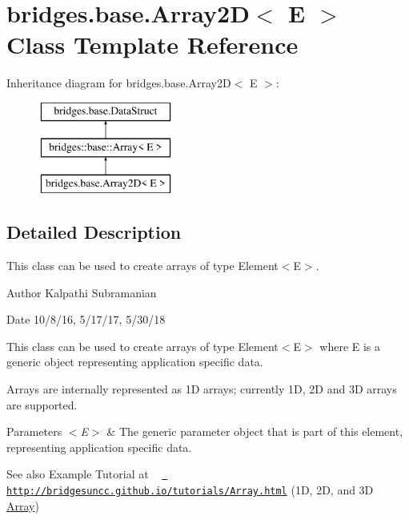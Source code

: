 \hypertarget{classbridges_1_1base_1_1_array2_d}{}\section{bridges.\+base.\+Array2D$<$ E $>$ Class Template Reference}
\label{classbridges_1_1base_1_1_array2_d}
Inheritance diagram for bridges.\+base.\+Array2D$<$ E $>$\+:\begin{figure}[H]
\begin{center}
\leavevmode
\includegraphics[height=3.000000cm]{classbridges_1_1base_1_1_array2_d}
\end{center}
\end{figure}


\subsection{Detailed Description}
This class can be used to create arrays of type Element$<$\+E$>$. 

\begin{DoxyAuthor}{Author}
Kalpathi Subramanian
\end{DoxyAuthor}
\begin{DoxyDate}{Date}
10/8/16, 5/17/17, 5/30/18
\end{DoxyDate}
This class can be used to create arrays of type Element$<$\+E$>$ where E is a generic object representing application specific data.

Arrays are internally represented as 1D arrays; currently 1D, 2D and 3D arrays are supported.


\begin{DoxyParams}{Parameters}
{\em $<$\+E$>$} & The generic parameter object that is part of this element, representing application specific data.\\
\hline
\end{DoxyParams}
\begin{DoxySeeAlso}{See also}
Example Tutorial at ~\newline
 \href{http://bridgesuncc.github.io/tutorials/Array.html}{\texttt{ http\+://bridgesuncc.\+github.\+io/tutorials/\+Array.\+html}} (1D, 2D, and 3D \mbox{\hyperlink{classbridges_1_1base_1_1_array}{Array}})~\newline
 
\end{DoxySeeAlso}
